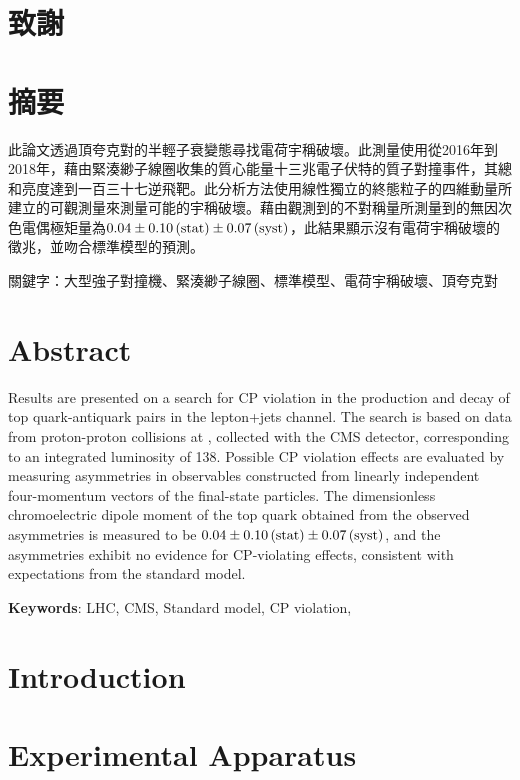 \documentclass[10pt,a4paper,twoside]{report}
\begin{document}
\begin{sloppypar}


\begin{CJK*}{UTF8}{bkai}
\chapter*{致謝}
\clearpage
\chapter*{摘要}
此論文透過頂夸克對的半輕子衰變態尋找電荷宇稱破壞。此測量使用從2016年到2018年，藉由緊湊緲子線圈收集的質心能量十三兆電子伏特的質子對撞事件，其總和亮度達到一百三十七逆飛靶。此分析方法使用線性獨立的終態粒子的四維動量所建立的可觀測量來測量可能的宇稱破壞。藉由觀測到的不對稱量所測量到的無因次色電偶極矩量為$0.04\pm 0.10\,\text{(stat)}\pm 0.07\,\text{(syst)}$，此結果顯示沒有電荷宇稱破壞的徵兆，並吻合標準模型的預測。

\noindent 關鍵字：大型強子對撞機、緊湊緲子線圈、標準模型、電荷宇稱破壞、頂夸克對
\clearpage
\end{CJK*}
\chapter*{Abstract}
Results are presented on a search for CP violation in the production and decay of top quark-antiquark pairs in the lepton+jets channel.
The search is based on data from proton-proton collisions at \newTeV, collected with the CMS detector, corresponding to an integrated luminosity of 138\fbinv. 
Possible CP violation effects are evaluated by measuring asymmetries in observables constructed from linearly independent four-momentum vectors of the final-state particles. 
The dimensionless chromoelectric dipole moment of the top quark obtained from the observed asymmetries is measured to be $0.04\pm 0.10\,\text{(stat)}\pm 0.07\,\text{(syst)}$, and the asymmetries exhibit no evidence for CP-violating effects, consistent with expectations from the standard model.

\noindent\textbf{Keywords}: LHC, CMS, Standard model, CP violation, \ttbar
\clearpage

\tableofcontents
\raggedbottom
\listoffigures
\listoftables

\chapter{Introduction}
    
\chapter{Experimental Apparatus}\label{sec:detector}
    

\end{sloppypar}
\end{document}
